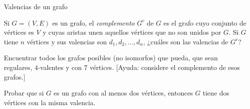 \begin{section}{Valencias de un grafo}
\begin{enumex}
\item Si $G=(V,E)$ es un grafo, el \textit{complemento} $G^c$ de $G$ es el grafo cuyo conjunto de vértices es $V$ y cuyas aristas unen aquellos vértices que no son unidos por $G$. Si $G$ tiene $n$ vértices y sus valencias son $d_1,d_2,\ldots,d_n$, ¿cuáles son las valencias de $G^c$? 

\item Encuentrar todos los grafos posibles (no isomorfos) que pueda, que sean regulares, $4$-valentes y con $7$ vértices. [Ayuda: considere el complemento de esos grafos.]

\item Probar que si $G$ es un grafo con al menos dos vértices, entonces $G$ tiene dos vértices con la misma valencia.
\end{enumex}

\end{section}


